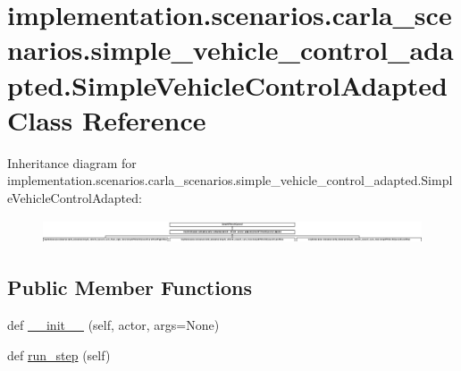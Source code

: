 \hypertarget{classimplementation_1_1scenarios_1_1carla__scenarios_1_1simple__vehicle__control__adapted_1_1_simple_vehicle_control_adapted}{}\section{implementation.\+scenarios.\+carla\+\_\+scenarios.\+simple\+\_\+vehicle\+\_\+control\+\_\+adapted.\+Simple\+Vehicle\+Control\+Adapted Class Reference}
\label{classimplementation_1_1scenarios_1_1carla__scenarios_1_1simple__vehicle__control__adapted_1_1_simple_vehicle_control_adapted}
Inheritance diagram for implementation.\+scenarios.\+carla\+\_\+scenarios.\+simple\+\_\+vehicle\+\_\+control\+\_\+adapted.\+Simple\+Vehicle\+Control\+Adapted\+:\begin{figure}[H]
\begin{center}
\leavevmode
\includegraphics[height=0.737813cm]{classimplementation_1_1scenarios_1_1carla__scenarios_1_1simple__vehicle__control__adapted_1_1_simple_vehicle_control_adapted}
\end{center}
\end{figure}
\subsection*{Public Member Functions}
\begin{DoxyCompactItemize}
\item 
def \hyperlink{classimplementation_1_1scenarios_1_1carla__scenarios_1_1simple__vehicle__control__adapted_1_1_simple_vehicle_control_adapted_ab8480f0c42238a13f8504d84f893b762}{\+\_\+\+\_\+init\+\_\+\+\_\+} (self, actor, args=None)
\item 
def \hyperlink{classimplementation_1_1scenarios_1_1carla__scenarios_1_1simple__vehicle__control__adapted_1_1_simple_vehicle_control_adapted_acc7f8329b0043a22bd7095e7d58ead1b}{run\+\_\+step} (self)
\end{DoxyCompactItemize}



